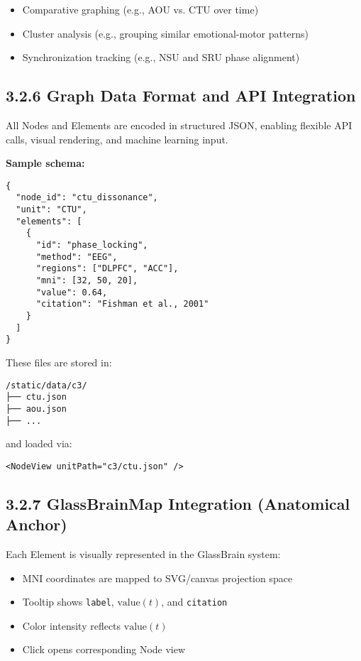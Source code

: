 \begin{itemize}
    \item Comparative graphing (e.g., AOU vs. CTU over time)
    \item Cluster analysis (e.g., grouping similar emotional-motor patterns)
    \item Synchronization tracking (e.g., NSU and SRU phase alignment)
\end{itemize}

\subsection*{3.2.6 Graph Data Format and API Integration}

All Nodes and Elements are encoded in structured JSON, enabling flexible API calls, visual rendering, and machine learning input.

\textbf{Sample schema:}

\begin{verbatim}
{
  "node_id": "ctu_dissonance",
  "unit": "CTU",
  "elements": [
    {
      "id": "phase_locking",
      "method": "EEG",
      "regions": ["DLPFC", "ACC"],
      "mni": [32, 50, 20],
      "value": 0.64,
      "citation": "Fishman et al., 2001"
    }
  ]
}
\end{verbatim}

These files are stored in:

\begin{verbatim}
/static/data/c3/
├── ctu.json
├── aou.json
├── ...
\end{verbatim}

and loaded via:

\begin{verbatim}
<NodeView unitPath="c3/ctu.json" />
\end{verbatim}

\subsection*{3.2.7 GlassBrainMap Integration (Anatomical Anchor)}

Each Element is visually represented in the GlassBrain system:

\begin{itemize}
    \item MNI coordinates are mapped to SVG/canvas projection space
    \item Tooltip shows \texttt{label}, $\text{value}(t)$, and \texttt{citation}
    \item Color intensity reflects $\text{value}(t)$
    \item Click opens corresponding Node view
\end{itemize}

